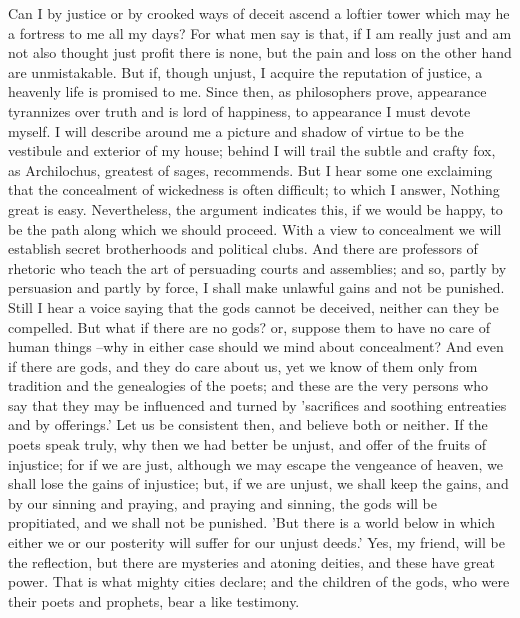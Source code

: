 Can I by justice or by crooked ways of deceit ascend a loftier tower which may he a fortress to me all my days? For what men say is that, if I am really just and am not also thought just profit there is none, but the pain and loss on the other hand are unmistakable. But if, though unjust, I acquire the reputation of justice, a heavenly life is promised to me. Since then, as philosophers prove, appearance tyrannizes over truth and is lord of happiness, to appearance I must devote myself. I will describe around me a picture and shadow of virtue to be the vestibule and exterior of my house; behind I will trail the subtle and crafty fox, as Archilochus, greatest of sages, recommends. But I hear some one exclaiming that the concealment of wickedness is often difficult; to which I answer, Nothing great is easy. Nevertheless, the argument indicates this, if we would be happy, to be the path along which we should proceed. With a view to concealment we will establish secret brotherhoods and political clubs. And there are professors of rhetoric who teach the art of persuading courts and assemblies; and so, partly by persuasion and partly by force, I shall make unlawful gains and not be punished. Still I hear a voice saying that the gods cannot be deceived, neither can they be compelled. But what if there are no gods? or, suppose them to have no care of human things --why in either case should we mind about concealment? And even if there are gods, and they do care about us, yet we know of them only from tradition and the genealogies of the poets; and these are the very persons who say that they may be influenced and turned by 'sacrifices and soothing entreaties and by offerings.' Let us be consistent then, and believe both or neither. If the poets speak truly, why then we had better be unjust, and offer of the fruits of injustice; for if we are just, although we may escape the vengeance of heaven, we shall lose the gains of injustice; but, if we are unjust, we shall keep the gains, and by our sinning and praying, and praying and sinning, the gods will be propitiated, and we shall not be punished. 'But there is a world below in which either we or our posterity will suffer for our unjust deeds.' Yes, my friend, will be the reflection, but there are mysteries and atoning deities, and these have great power. That is what mighty cities declare; and the children of the gods, who were their poets and prophets, bear a like testimony.

